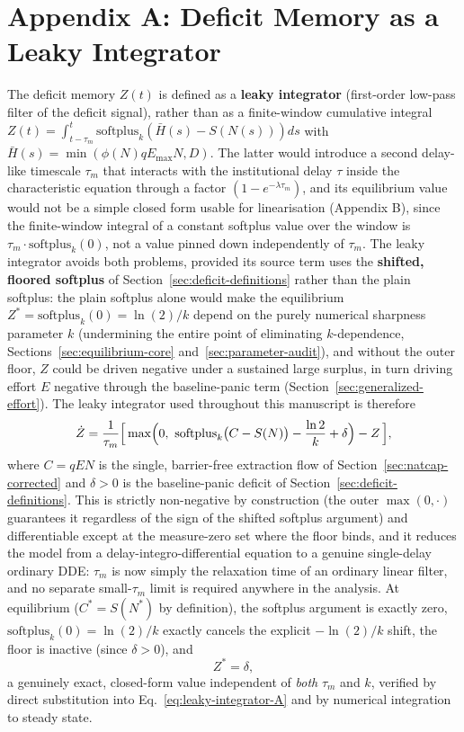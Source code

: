 \documentclass[twocolumn,10pt]{article}
\begin{document}
\section{Appendix A: Deficit Memory as a Leaky Integrator}
The deficit memory $Z(t)$ is defined as a \textbf{leaky integrator} (first-order low-pass filter of the deficit signal), rather than as a finite-window cumulative integral $Z(t) = \int_{t-\tau_m}^t \text{softplus}_k( \bar{H}(s) - S(N(s)) ) ds$ with \(\bar{H}(s) = \min( \phi(N) q E_{\max} N, D )\). The latter would introduce a second delay-like timescale $\tau_m$ that interacts with the institutional delay $\tau$ inside the characteristic equation through a factor $(1-e^{-\lambda\tau_m})$, and its equilibrium value would not be a simple closed form usable for linearisation (Appendix B), since the finite-window integral of a constant softplus value over the window is $\tau_m\cdot\text{softplus}_k(0)$, not a value pinned down independently of $\tau_m$. The leaky integrator avoids both problems, provided its source term uses the \textbf{shifted, floored softplus} of Section~\ref{sec:deficit-definitions} rather than the plain softplus: the plain softplus alone would make the equilibrium $Z^*=\text{softplus}_k(0)=\ln(2)/k$ depend on the purely numerical sharpness parameter $k$ (undermining the entire point of eliminating $k$-dependence, Sections~\ref{sec:equilibrium-core} and~\ref{sec:parameter-audit}), and without the outer floor, $Z$ could be driven negative under a sustained large surplus, in turn driving effort $E$ negative through the baseline-panic term (Section~\ref{sec:generalized-effort}). The leaky integrator used throughout this manuscript is therefore
\begin{equation}
\dot Z = \frac{1}{\tau_m}\Bigl[\,\max\Bigl(0,\ \text{softplus}_k\bigl(C - S(N)\bigr) - \frac{\ln 2}{k} + \delta\Bigr) - Z\,\Bigr],
\label{eq:leaky-integrator-A}
\end{equation}
where $C=qEN$ is the single, barrier-free extraction flow of Section~\ref{sec:natcap-corrected} and $\delta>0$ is the baseline-panic deficit of Section~\ref{sec:deficit-definitions}. This is strictly non-negative by construction (the outer $\max(0,\cdot)$ guarantees it regardless of the sign of the shifted softplus argument) and differentiable except at the measure-zero set where the floor binds, and it reduces the model from a delay-integro-differential equation to a genuine single-delay ordinary DDE: $\tau_m$ is now simply the relaxation time of an ordinary linear filter, and no separate small-$\tau_m$ limit is required anywhere in the analysis. At equilibrium ($C^*=S(N^*)$ by definition), the softplus argument is exactly zero, $\text{softplus}_k(0)=\ln(2)/k$ exactly cancels the explicit $-\ln(2)/k$ shift, the floor is inactive (since $\delta>0$), and
\[
Z^* = \delta,
\]
a genuinely exact, closed-form value independent of \emph{both} $\tau_m$ and $k$, verified by direct substitution into Eq.~\eqref{eq:leaky-integrator-A} and by numerical integration to steady state.
\end{document}
